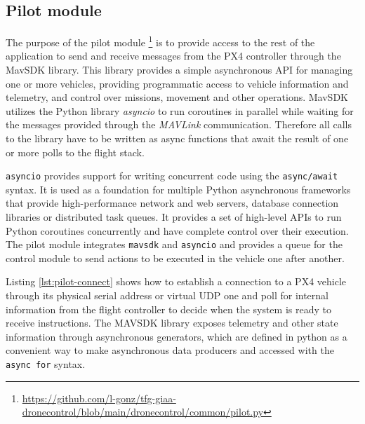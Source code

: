 \subsection{Pilot module}
\label{subsec:pilot-module}
The purpose of the pilot module \footnote{\url{https://github.com/l-gonz/tfg-giaa-dronecontrol/blob/main/dronecontrol/common/pilot.py}} is to provide access to the rest of the application to send and receive messages from the PX4 controller through the MavSDK library.
This library provides a simple asynchronous API for managing one or more vehicles, providing programmatic access to vehicle information and telemetry, and control over missions, movement and other operations.
MavSDK utilizes the Python library \emph{asyncio} to run coroutines in parallel while waiting for the messages provided through the \emph{MAVLink} communication.
Therefore all calls to the library have to be written as async functions that await the result of one or more polls to the flight stack.

\texttt{asyncio} provides support for writing concurrent code using the \texttt{async/await} syntax.
It is used as a foundation for multiple Python asynchronous frameworks that provide high-performance network and web servers, database connection libraries or distributed task queues.
It provides a set of high-level APIs to run Python coroutines concurrently and have complete control over their execution.
The pilot module integrates \texttt{mavsdk} and \texttt{asyncio} and provides a queue for the control module to send actions to be executed in the vehicle one after another.

Listing \ref{lst:pilot-connect} shows how to establish a connection to a PX4 vehicle through its physical serial address or virtual UDP one and poll for internal information from the flight controller to decide when the system is ready to receive instructions.
The MAVSDK library exposes telemetry and other state information through asynchronous generators, which are defined in python as a convenient way to make asynchronous data producers and accessed with the \texttt{async for} syntax.


